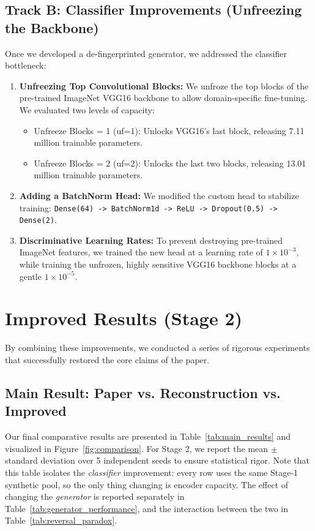 \documentclass[11pt]{article}
\newcommand{\code}[1]{\texttt{#1}}
\begin{document}
\subsection{Track B: Classifier Improvements (Unfreezing the Backbone)}
Once we developed a de-fingerprinted generator, we addressed the classifier bottleneck:
\begin{enumerate}[nosep, leftmargin=1.5em]
  \item \textbf{Unfreezing Top Convolutional Blocks:} We unfroze the top blocks of the pre-trained ImageNet VGG16 backbone to allow domain-specific fine-tuning. We evaluated two levels of capacity:
  \begin{itemize}[nosep, leftmargin=1.5em]
    \item Unfreeze Blocks = 1 (uf=1): Unlocks VGG16's last block, releasing 7.11 million trainable parameters.
    \item Unfreeze Blocks = 2 (uf=2): Unlocks the last two blocks, releasing 13.01 million trainable parameters.
  \end{itemize}
  \item \textbf{Adding a BatchNorm Head:} We modified the custom head to stabilize training: \code{Dense(64) -> BatchNorm1d -> ReLU -> Dropout(0.5) -> Dense(2)}.
  \item \textbf{Discriminative Learning Rates:} To prevent destroying pre-trained ImageNet features, we trained the new head at a learning rate of $1 \times 10^{-3}$, while training the unfrozen, highly sensitive VGG16 backbone blocks at a gentle $1 \times 10^{-5}$.
\end{enumerate}

\section{Improved Results (Stage 2)} \label{sec:improved_results}
By combining these improvements, we conducted a series of rigorous experiments that successfully restored the core claims of the paper.

\subsection{Main Result: Paper vs. Reconstruction vs. Improved}
Our final comparative results are presented in Table~\ref{tab:main_results} and visualized in Figure~\ref{fig:comparison}. For Stage 2, we report the mean $\pm$ standard deviation over 5 independent seeds to ensure statistical rigor. Note that this table isolates the \emph{classifier} improvement: every row uses the same Stage-1 synthetic pool, so the only thing changing is encoder capacity. The effect of changing the \emph{generator} is reported separately in Table~\ref{tab:generator_performance}, and the interaction between the two in Table~\ref{tab:reversal_paradox}.
\end{document}
